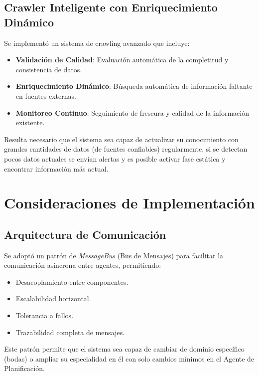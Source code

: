 \documentclass[runningheads,a4paper]{llncs}
\begin{document}
\subsection{Crawler Inteligente con Enriquecimiento Dinámico}

Se implementó un sistema de crawling avanzado que incluye:

\begin{itemize}
    \item \textbf{Validación de Calidad}: Evaluación automática de la completitud y consistencia de datos.
    \item \textbf{Enriquecimiento Dinámico}: Búsqueda automática de información faltante en fuentes externas.
    \item \textbf{Monitoreo Continuo}: Seguimiento de frescura y calidad de la información existente.
\end{itemize}

Resulta necesario que el sistema sea capaz de actualizar su conocimiento con grandes cantidades de datos (de fuentes 
confiables) regularmente, si se detectan pocos datos actuales se envían alertas y es posible activar fase estática y 
encontrar información más actual.

\section{Consideraciones de Implementación}

\subsection{Arquitectura de Comunicación}

Se adoptó un patrón de \textit{MessageBus} (Bus de Mensajes) para facilitar la comunicación asíncrona entre agentes, 
permitiendo:

\begin{itemize}
    \item Desacoplamiento entre componentes.
    \item Escalabilidad horizontal.
    \item Tolerancia a fallos.
    \item Trazabilidad completa de mensajes.
\end{itemize}

Este patrón permite que el sistema sea capaz de cambiar de dominio específico (bodas) o ampliar su especialidad en él con 
solo cambios mínimos en el Agente de Planificación.
\end{document}
